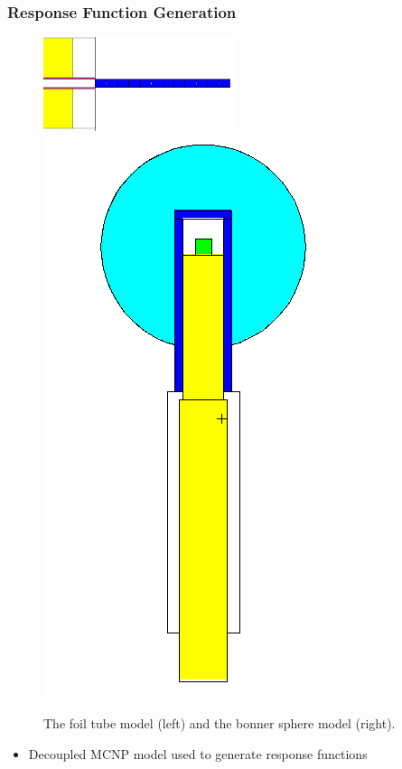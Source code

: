 \documentclass[fleqn]{beamer}
\begin{document}
\begin{frame}
\frametitle{Response Function Generation}

\begin{figure}
\centering
\includegraphics[width = 0.5\textwidth]{mcnpft}
\includegraphics[height = 0.4\textheight]{bonner}
\caption{The foil tube model (left) and the bonner sphere model (right).}
\end{figure}


\begin{itemize}
\item Decoupled MCNP model used to generate response functions
\end{itemize}



\end{frame}
\end{document}
